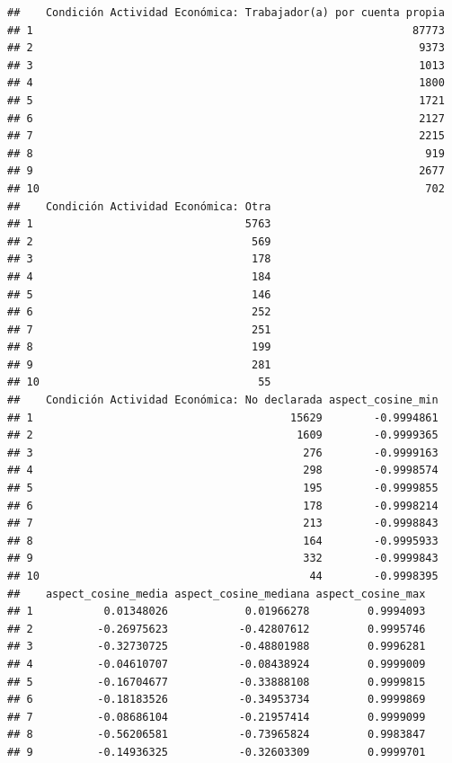 \documentclass[11pt,]{article}
\begin{document}
\begin{verbatim}
##    Condición Actividad Económica: Trabajador(a) por cuenta propia
## 1                                                           87773
## 2                                                            9373
## 3                                                            1013
## 4                                                            1800
## 5                                                            1721
## 6                                                            2127
## 7                                                            2215
## 8                                                             919
## 9                                                            2677
## 10                                                            702
##    Condición Actividad Económica: Otra
## 1                                 5763
## 2                                  569
## 3                                  178
## 4                                  184
## 5                                  146
## 6                                  252
## 7                                  251
## 8                                  199
## 9                                  281
## 10                                  55
##    Condición Actividad Económica: No declarada aspect_cosine_min
## 1                                        15629        -0.9994861
## 2                                         1609        -0.9999365
## 3                                          276        -0.9999163
## 4                                          298        -0.9998574
## 5                                          195        -0.9999855
## 6                                          178        -0.9998214
## 7                                          213        -0.9998843
## 8                                          164        -0.9995933
## 9                                          332        -0.9999843
## 10                                          44        -0.9998395
##    aspect_cosine_media aspect_cosine_mediana aspect_cosine_max
## 1           0.01348026            0.01966278         0.9994093
## 2          -0.26975623           -0.42807612         0.9995746
## 3          -0.32730725           -0.48801988         0.9996281
## 4          -0.04610707           -0.08438924         0.9999009
## 5          -0.16704677           -0.33888108         0.9999815
## 6          -0.18183526           -0.34953734         0.9999869
## 7          -0.08686104           -0.21957414         0.9999099
## 8          -0.56206581           -0.73965824         0.9983847
## 9          -0.14936325           -0.32603309         0.9999701

\end{verbatim}
\end{document}
